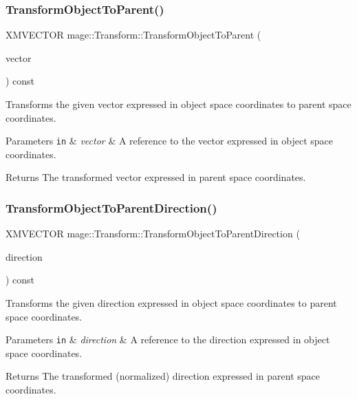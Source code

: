 \subsubsection{\texorpdfstring{Transform\+Object\+To\+Parent()}{TransformObjectToParent()}}
{\footnotesize\ttfamily X\+M\+V\+E\+C\+T\+OR mage\+::\+Transform\+::\+Transform\+Object\+To\+Parent (\begin{DoxyParamCaption}\item[{const X\+M\+V\+E\+C\+T\+OR \&}]{vector }\end{DoxyParamCaption}) const}

Transforms the given vector expressed in object space coordinates to parent space coordinates.


\begin{DoxyParams}[1]{Parameters}
\mbox{\tt in}  & {\em vector} & A reference to the vector expressed in object space coordinates. \\
\hline
\end{DoxyParams}
\begin{DoxyReturn}{Returns}
The transformed vector expressed in parent space coordinates. 
\end{DoxyReturn}
\hypertarget{structmage_1_1_transform_acc7a0f4ce2d6585fb19c1a6272cc84d2}{}\label{structmage_1_1_transform_acc7a0f4ce2d6585fb19c1a6272cc84d2} 
\subsubsection{\texorpdfstring{Transform\+Object\+To\+Parent\+Direction()}{TransformObjectToParentDirection()}}
{\footnotesize\ttfamily X\+M\+V\+E\+C\+T\+OR mage\+::\+Transform\+::\+Transform\+Object\+To\+Parent\+Direction (\begin{DoxyParamCaption}\item[{const X\+M\+V\+E\+C\+T\+OR \&}]{direction }\end{DoxyParamCaption}) const\hspace{0.3cm}{\ttfamily [private]}}

Transforms the given direction expressed in object space coordinates to parent space coordinates.


\begin{DoxyParams}[1]{Parameters}
\mbox{\tt in}  & {\em direction} & A reference to the direction expressed in object space coordinates. \\
\hline
\end{DoxyParams}
\begin{DoxyReturn}{Returns}
The transformed (normalized) direction expressed in parent space coordinates. 
\end{DoxyReturn}
\hypertarget{structmage_1_1_transform_a3e5b476d0078f6bf243a7effa0f781fc}{}\label{structmage_1_1_transform_a3e5b476d0078f6bf243a7effa0f781fc} 
